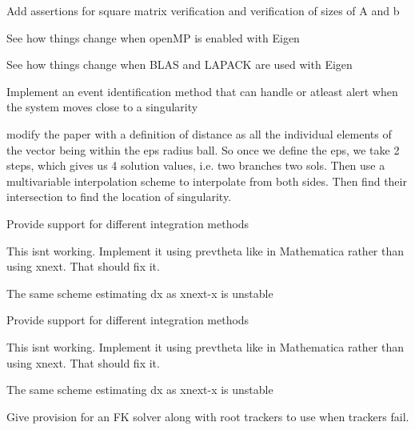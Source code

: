 
\begin{DoxyRefList}
\item[Member \mbox{\hyperlink{utils_8hh_a7ed506e6d7b8ba153e1b8b24a7b6e5c4}{linear\+Solve}} (Matrix\+Xd Amat, Vector\+Xd bvec)]\label{todo__todo000015}%
%
Add assertions for square matrix verification and verification of sizes of A and b  
\item[Class \mbox{\hyperlink{classRootTracker}{Root\+Tracker}} ]\label{todo__todo000007}%
%
See how things change when open\+MP is enabled with Eigen 

See how things change when BLAS and LAPACK are used with Eigen 

Implement an event identification method that can handle or atleast alert when the system moves close to a singularity

\label{todo__todo000008}%
%
modify the paper with a definition of distance as all the individual elements of the vector being within the eps radius ball. So once we define the eps, we take 2 steps, which gives us 4 solution values, i.\+e. two branches two sols. Then use a multivariable interpolation scheme to interpolate from both sides. Then find their intersection to find the location of singularity.  
\item[Member \mbox{\hyperlink{classRootTracker_acc5d4b8e89ace70cee9c227f033e5a92}{Root\+Tracker\+::DMTracker}} (Vector\+Xd xprev, Vector\+Xd x, Vector\+Xd y, std\+::function$<$ Matrix\+Xd(\+Vector\+Xd)$>$ Jfx, std\+::function$<$ Matrix\+Xd(\+Vector\+Xd)$>$ Jfy, double eps=0, std\+::function$<$ Vector\+Xd(\+Vector\+Xd)$>$ f=NULL)]\label{todo__todo000004}%
%
Provide support for different integration methods 

This isnt working. Implement it using prevtheta like in Mathematica rather than using xnext. That should fix it. 

The same scheme estimating dx as xnext-\/x is unstable 

\label{todo__todo000012}%
%
Provide support for different integration methods 

This isnt working. Implement it using prevtheta like in Mathematica rather than using xnext. That should fix it. 

The same scheme estimating dx as xnext-\/x is unstable  
\item[Member \mbox{\hyperlink{classRootTracker_a0d29be3a24392b6a864b8e471f23db6c}{Root\+Tracker\+::Methods}} ()]\label{todo__todo000001}%
%
Give provision for an FK solver along with root trackers to use when trackers fail. 


\end{DoxyRefList}
